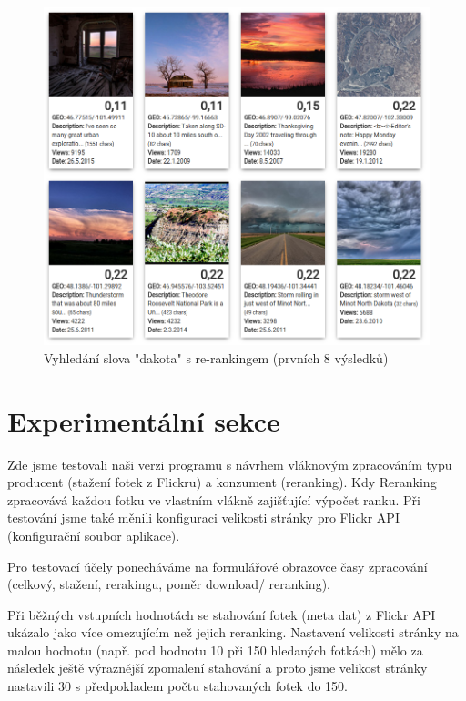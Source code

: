 \documentclass[12pt,oneside,a4paper]{article}
\begin{document}
\begin{figure} \begin{center}
\includegraphics[width=13.5cm]{pics/dakota_geo.png} \caption{Vyhledání slova "dakota" s re-rankingem (prvních 8 výsledků)}
\label{fig:dakota_geo}
\end{center} \end{figure}


\section{Experimentální sekce}
Zde jsme testovali naši verzi programu s návrhem vláknovým zpracováním typu producent (stažení fotek z Flickru) a konzument (reranking). Kdy Reranking zpracovává každou fotku ve vlastním vlákně zajišťující výpočet ranku. Při testování jsme také měnili konfiguraci velikosti stránky pro Flickr API (konfigurační soubor aplikace).

Pro testovací účely ponecháváme na formulářové obrazovce časy zpracování (celkový, stažení, rerakingu, poměr download/ reranking).

Při běžných vstupních hodnotách se stahování fotek (meta dat) z Flickr API ukázalo jako více omezujícím než jejich reranking. Nastavení velikosti stránky na malou hodnotu (např. pod hodnotu 10 při 150 hledaných fotkách) mělo za následek ještě výraznější zpomalení stahování a proto jsme velikost stránky nastavili 30 s předpokladem počtu stahovaných fotek do 150.
\end{document}
